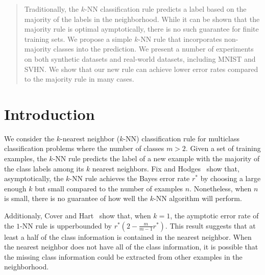 \documentclass{article}
\begin{document}
 


\begin{abstract}
  Traditionally, the $k$-NN classification rule predicts a label based
  on the majority of the labels in the neighborhood. While it can be
  shown that the majority rule is optimal aymptotically, there is no
  such guarantee for finite training sets. We propose a simple $k$-NN
  rule that incorporates non-majority classes into the prediction. We
  present a number of experiments on both synthetic datasets and
  real-world datasets, including MNIST and SVHN. We show that our new
  rule can achieve lower error rates compared to the majority rule in
  many cases.
\end{abstract} 

\section{Introduction}
\label{sec:intro}

We consider the $k$-nearest neighbor ($k$-NN) classification rule for
multiclass classification problems where the number of classes $m >
2$. Given a set of training examples, the $k$-NN rule predicts the
label of a new example with the majority of the class labels among its
$k$ nearest neighbors. Fix and Hodges~\cite{Fix1951} show that,
asymptotically, the $k$-NN rule achieves the Bayes error rate $r^*$ by
choosing a large enough $k$ but small compared to the number of
examples $n$. Nonetheless, when $n$ is small, there is no guarantee of
how well the $k$-NN algorithm will perform. 

Additionaly, Cover and Hart~\cite{Cover1967} show that, when $k = 1$,
the aymptotic error rate of the $1$-NN rule is upperbounded by $r^*(2
- \frac{m}{m-1}r^*)$. This result suggests that at least a half of the
class information is contained in the nearest neighbor. When the
nearest neighbor does not have all of the class information, it is
possible that the missing class information could be extracted from
other examples in the neighborhood.
\end{document}
